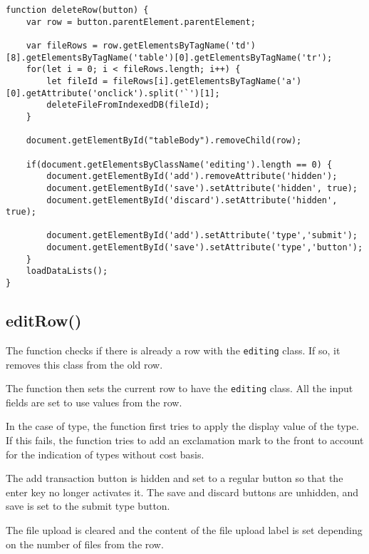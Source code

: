 \documentclass[letterpaper]{article}
\begin{document}
\begin{lstlisting}[firstnumber=246]
function deleteRow(button) {
    var row = button.parentElement.parentElement;

    var fileRows = row.getElementsByTagName('td')[8].getElementsByTagName('table')[0].getElementsByTagName('tr');
    for(let i = 0; i < fileRows.length; i++) {
        let fileId = fileRows[i].getElementsByTagName('a')[0].getAttribute('onclick').split('`')[1];
        deleteFileFromIndexedDB(fileId);
    }

    document.getElementById("tableBody").removeChild(row);

    if(document.getElementsByClassName('editing').length == 0) {
        document.getElementById('add').removeAttribute('hidden');
        document.getElementById('save').setAttribute('hidden', true);
        document.getElementById('discard').setAttribute('hidden', true);

        document.getElementById('add').setAttribute('type','submit');
        document.getElementById('save').setAttribute('type','button');
    }
    loadDataLists();
}
\end{lstlisting}

\subsection{editRow()}

The function checks if there is already a row with the \lstinline{editing} class.
If so, it removes this class from the old row.

The function then sets the current row to have the \lstinline{editing} class.
All the input fields are set to use values from the row.

In the case of type, the function first tries to apply the display value of the type.
If this fails, the function tries to add an exclamation mark to the front to account for the indication of types without cost basis.

The add transaction button is hidden and set to a regular button so that the enter key no longer activates it.
The save and discard buttons are unhidden, and save is set to the submit type button.

The file upload is cleared and the content of the file upload label is set depending on the number of files from the row.
\end{document}
